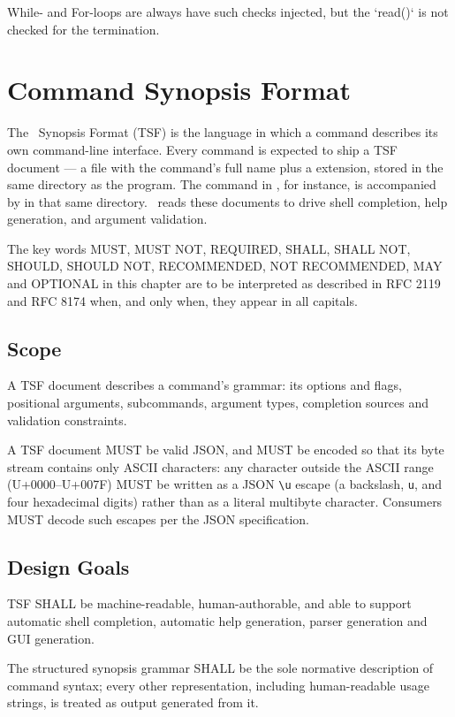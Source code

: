 While- and For-loops are always have such checks injected, but the `read()` is not checked for the termination.


\chapter{Command Synopsis Format}
\label{ch:tsf}

The \thedos\ Synopsis Format (TSF) is the language in which a command describes its own command-line interface. Every command is expected to ship a TSF document --- a file with the command's full name plus a  extension, stored in the same directory as the program. The command  in , for instance, is accompanied by  in that same directory. \thedos\ reads these documents to drive shell completion, help generation, and argument validation.

The key words MUST, MUST NOT, REQUIRED, SHALL, SHALL NOT, SHOULD, SHOULD NOT, RECOMMENDED, NOT RECOMMENDED, MAY and OPTIONAL in this chapter are to be interpreted as described in RFC 2119 and RFC 8174 when, and only when, they appear in all capitals.

\section{Scope}

A TSF document describes a command's grammar: its options and flags, positional arguments, subcommands, argument types, completion sources and validation constraints.

A TSF document MUST be valid JSON, and MUST be encoded so that its byte stream contains only ASCII characters: any character outside the ASCII range (U+0000--U+007F) MUST be written as a JSON \texttt{\textbackslash u} escape (a backslash, \texttt{u}, and four hexadecimal digits) rather than as a literal multibyte character. Consumers MUST decode such escapes per the JSON specification.

\section{Design Goals}

TSF SHALL be machine-readable, human-authorable, and able to support automatic shell completion, automatic help generation, parser generation and GUI generation.

The structured synopsis grammar SHALL be the sole normative description of command syntax; every other representation, including human-readable usage strings, is treated as output generated from it.

